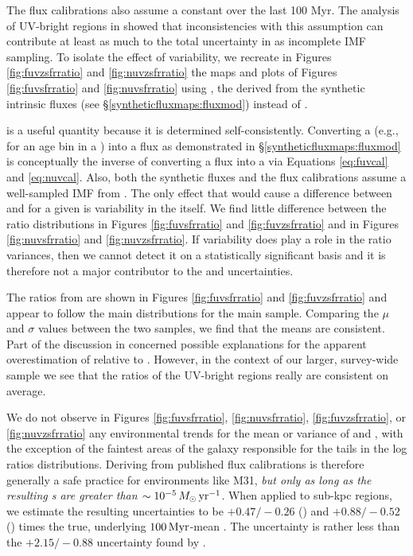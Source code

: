 \documentclass[iop, tighten]{emulateapj}
\begin{document}
The flux calibrations also assume a constant \sfh{} over the last 100 Myr. The
analysis of UV-bright regions in \citet{Simones:2014} showed that
inconsistencies with this assumption can contribute at least as much to the
total uncertainty in \sfrfuv{} as incomplete IMF sampling. To isolate the
effect of \sfh{} variability, we recreate in Figures \ref{fig:fuvzsfrratio} and
\ref{fig:nuvzsfrratio} the maps and plots of Figures \ref{fig:fuvsfrratio} and
\ref{fig:nuvsfrratio} using \sfrxz{}, the  derived from the synthetic
intrinsic fluxes (see \S \ref{syntheticfluxmaps:fluxmod}) instead of \sfrx{}.

\figfuvzsfrratio

\fignuvzsfrratio

\sfrxz{} is a useful quantity because it is determined self-consistently.
Converting a \sfr{} (e.g., for an age bin in a \sfh{}) into a flux as
demonstrated in \S \ref{syntheticfluxmaps:fluxmod} is conceptually the inverse
of converting a flux into a \sfr{} via Equations \ref{eq:fuvcal} and
\ref{eq:nuvcal}. Also, both the synthetic fluxes and the flux calibrations
assume a well-sampled IMF from \citet{Kroupa:2001}. The only effect that would
cause a difference between \sfroneh{} and \sfrxz{} for a given \sfh{} is
variability in the \sfh{} itself. We find little difference between the \sfr{}
ratio distributions in Figures \ref{fig:fuvsfrratio} and \ref{fig:fuvzsfrratio}
and in Figures \ref{fig:nuvsfrratio} and \ref{fig:nuvzsfrratio}. If \sfh{}
variability does play a role in the \sfr{} ratio variances, then we cannot
detect it on a statistically significant basis and it is therefore not a major
contributor to the \sfrx{} and \sfrxz{} uncertainties.

The \fuv{} \sfr{} ratios from \citet{Simones:2014} are shown in Figures
\ref{fig:fuvsfrratio} and \ref{fig:fuvzsfrratio} and appear to follow the main
distributions for the main sample. Comparing the $\mu$ and $\sigma$ values
between the two samples, we find that the means are consistent. Part of the
discussion in \citet{Simones:2014} concerned possible explanations for the
apparent overestimation of  relative to \sfroneh{}. However, in the
context of our larger, survey-wide sample we see that the \sfr{} ratios of the
UV-bright regions really are consistent on average.

We do not observe in Figures \ref{fig:fuvsfrratio}, \ref{fig:nuvsfrratio},
\ref{fig:fuvzsfrratio}, or \ref{fig:nuvzsfrratio} any environmental trends for
the mean or variance of \sfrx{} and \sfrxz{}, with the exception of the
faintest areas of the galaxy responsible for the tails in the log \sfr{} ratios
distributions. Deriving  from published flux calibrations is therefore
generally a safe practice for environments like M31, \emph{but only as long as
the resulting \sfr{}s are greater than $\sim 10^{-5}\,M_\odot\,\mathrm{yr}^{-1}$}. When
applied to sub-kpc regions, we estimate the resulting uncertainties to be
$+\!0.47/\!-\!0.26$ (\fuv{}) and $+\!0.88/\!-\!0.52$ (\nuv{}) times the true,
underlying $100\,\mathrm{Myr}$-mean \sfr{}. The \sfrfuv{} uncertainty is rather less than
the $+\!2.15/\!-\!0.88$ uncertainty found by \citet{Simones:2014}.
\end{document}
